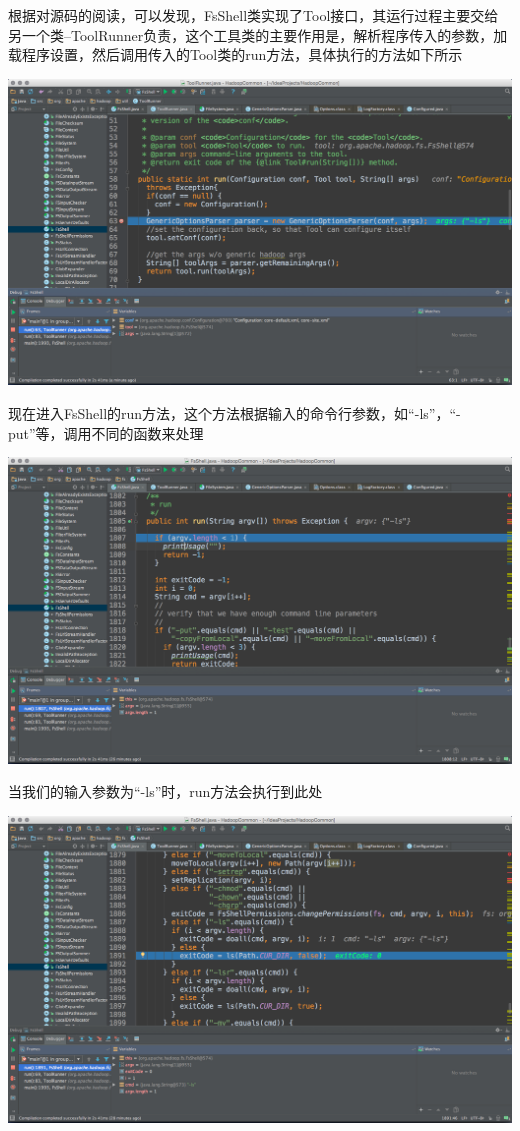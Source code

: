 根据对源码的阅读，可以发现，FsShell类实现了Tool接口，其运行过程主要交给另一个类--ToolRunner负责，这个工具类的主要作用是，解析程序传入的参数，加载程序设置，然后调用传入的Tool类的run方法，具体执行的方法如下所示

\includegraphics[width=\textwidth]{image/env/cr34.png}

现在进入FsShell的run方法，这个方法根据输入的命令行参数，如``-ls''，``-put''等，调用不同的函数来处理

\includegraphics[width=\textwidth]{image/env/cr35.png}

当我们的输入参数为``-ls''时，run方法会执行到此处

\includegraphics[width=\textwidth]{image/env/cr36.png}

